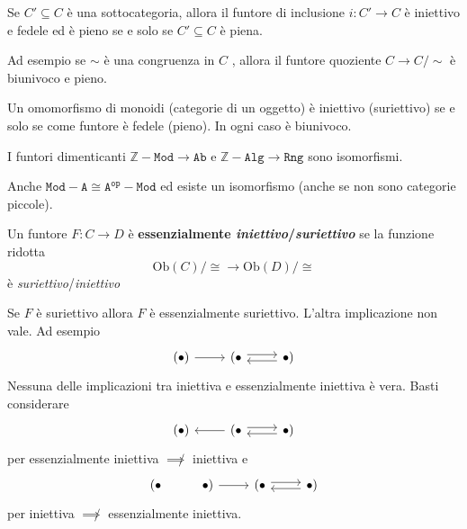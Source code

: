 \begin{example}{}
    Se \(C' \subseteq C \) è una sottocategoria, allora il funtore di inclusione
    \(i : C' \to C\) è iniettivo e fedele ed è pieno se e solo se \(C' \subseteq C\) è piena.

    Ad esempio se \(\sim \) è una congruenza in \(C\) , allora il funtore
    quoziente \(C \to C / \sim \) è biunivoco e pieno.
\end{example}

\begin{example}{}
    Un omomorfismo di monoidi (categorie di un oggetto) è iniettivo (suriettivo)
    se e solo se come funtore è fedele (pieno). In ogni caso è biunivoco.
\end{example}

\begin{example}{}
    I funtori dimenticanti \(\mathtt{\mathbb{Z}-Mod} \to \mathtt{Ab}\) e \(\mathtt{\mathbb{Z}-Alg} \to \mathtt{Rng}\) sono isomorfismi.
\end{example}

\begin{example}{}
    Anche \(\mathtt{Mod-A}\cong \mathtt{A^{op}-Mod}\) ed esiste un isomorfismo
    (anche se non sono categorie piccole).
\end{example}

\begin{definition}{}
    Un funtore \(F: C \to D\) è \textbf{essenzialmente
    \emph{iniettivo}/\emph{suriettivo}} se la funzione ridotta 
    \[
      \mathrm{Ob}{(C)}/\cong \to \mathrm{Ob}{(D)}/\cong
    \]
    è \emph{suriettivo}/\emph{iniettivo}
\end{definition}

\begin{remark}{}
    Se \(F\) è suriettivo allora \(F\) è essenzialmente suriettivo. L'altra
    implicazione non vale. Ad esempio
\[\begin{tikzcd}
	{(\bullet)} & {(\bullet} & {\bullet)}
	\arrow[from=1-1, to=1-2]
	\arrow[shift left, from=1-2, to=1-3]
	\arrow[shift left, from=1-3, to=1-2]
\end{tikzcd}\]
    Nessuna delle implicazioni tra iniettiva e essenzialmente iniettiva è vera.
    Basti considerare
\[\begin{tikzcd}
	{(\bullet)} & {(\bullet} & {\bullet)}
	\arrow[from=1-2, to=1-1]
	\arrow[shift left, from=1-2, to=1-3]
	\arrow[shift left, from=1-3, to=1-2]
\end{tikzcd}\]
    per essenzialmente iniettiva \(\not\implies\) iniettiva
    e
\[\begin{tikzcd}
	{(\bullet} & {\bullet)} & {(\bullet} & {\bullet)}
	\arrow[from=1-2, to=1-3]
	\arrow[shift left, from=1-3, to=1-4]
	\arrow[shift left, from=1-4, to=1-3]
\end{tikzcd}\]
    per iniettiva \(\not\implies \) essenzialmente iniettiva.
\end{remark}

